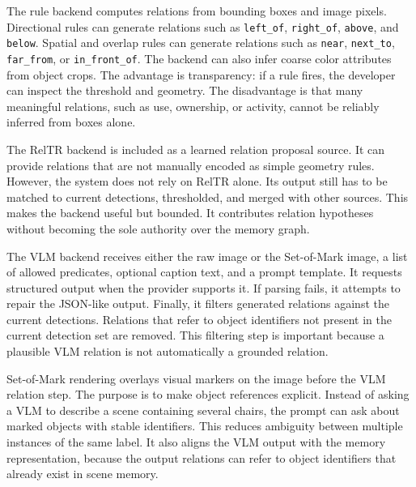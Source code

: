 The rule backend computes relations from bounding boxes and image pixels. Directional rules can generate relations such as \texttt{left\_of}, \texttt{right\_of}, \texttt{above}, and \texttt{below}. Spatial and overlap rules can generate relations such as \texttt{near}, \texttt{next\_to}, \texttt{far\_from}, or \texttt{in\_front\_of}. The backend can also infer coarse color attributes from object crops. The advantage is transparency: if a rule fires, the developer can inspect the threshold and geometry. The disadvantage is that many meaningful relations, such as use, ownership, or activity, cannot be reliably inferred from boxes alone.

The RelTR backend is included as a learned relation proposal source. It can provide relations that are not manually encoded as simple geometry rules. However, the system does not rely on RelTR alone. Its output still has to be matched to current detections, thresholded, and merged with other sources. This makes the backend useful but bounded. It contributes relation hypotheses without becoming the sole authority over the memory graph.

The VLM backend receives either the raw image or the Set-of-Mark image, a list of allowed predicates, optional caption text, and a prompt template. It requests structured output when the provider supports it. If parsing fails, it attempts to repair the JSON-like output. Finally, it filters generated relations against the current detections. Relations that refer to object identifiers not present in the current detection set are removed. This filtering step is important because a plausible VLM relation is not automatically a grounded relation.

Set-of-Mark rendering overlays visual markers on the image before the VLM relation step. The purpose is to make object references explicit. Instead of asking a VLM to describe a scene containing several chairs, the prompt can ask about marked objects with stable identifiers. This reduces ambiguity between multiple instances of the same label. It also aligns the VLM output with the memory representation, because the output relations can refer to object identifiers that already exist in scene memory.

